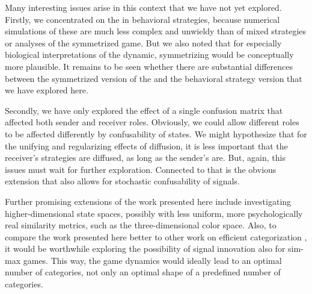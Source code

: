 Many interesting issues arise in this context that we have not yet
explored. Firstly, we concentrated on the \rdd in behavioral
strategies, because numerical simulations of these are much less
complex and unwieldy than of mixed strategies or analyses of the
symmetrized game. But we also noted that for especially biological
interpretations of the dynamic, symmetrizing would be conceptually
more plausible. It remains to be seen whether there are substantial
differences between the symmetrized version of the \rdd and the
behavioral strategy version that we have explored here.

Secondly, we have only explored the effect of a single confusion
matrix that affected both sender and receiver roles. Obviously, we
could allow different roles to be affected differently by
confusability of states. We might hypothesize that for the unifying
and regularizing effects of diffusion, it is less important that the
receiver's strategies are diffused, as long as the sender's are. But,
again, this issues must wait for further exploration. Connected to
that is the obvious extension that also allows for stochastic
confusability of signals.

Further promising extensions of the work presented here include
investigating higher-dimensional state spaces, possibly with less
uniform, more psychologically real similarity metrics, such as the
three-dimensional color space. Also, to compare the work presented
here better to other work on efficient categorization
\citep[e.g.][]{Mohlin2014:Optimal-Categor}, it would be worthwhile
exploring the possibility of signal innovation
\citep[e.g.][]{McKenzie-AlexanderSkymrs2012:Inventing-New-S} also for
sim-max games. This way, the game dynamics would ideally lead to an
optimal number of categories, not only an optimal shape of a
predefined number of categories.




